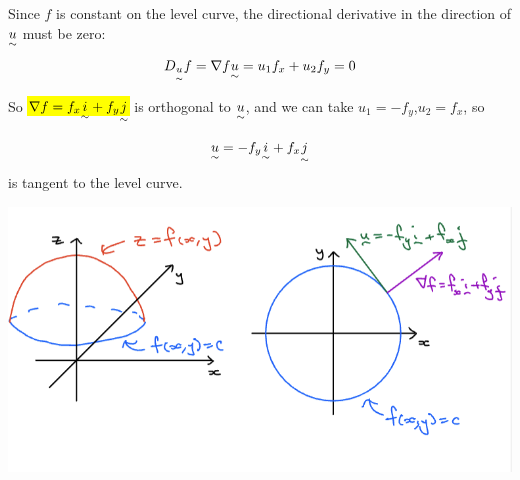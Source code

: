 \documentclass{article}
\begin{document}
\begin{itemize}
    Since $f$ is constant on the level curve, the directional derivative in the direction of $\underset{\sim}{u}$ must be zero:
    $$
      D_{\underset{\sim}{u}}f = \nabla f \underset{\sim}{u} = u_1 f_x + u_2 f_y = 0
    $$

    So \hl{$\nabla f = f_x \underset{\sim}{i} + f_y \underset{\sim}{j}$} is orthogonal to $\underset{\sim}{u}$, and we can take $u_1 = -f_y$,$u_2 = f_x$, so

    $$
      \underset{\sim}{u} = - f_y \underset{\sim}{i} + f_x \underset{\sim}{j}
    $$
    is tangent to the level curve.

    \includegraphics[width=\linewidth]{Graphs/w10_6.png}

  \end{itemize}
\end{document}

